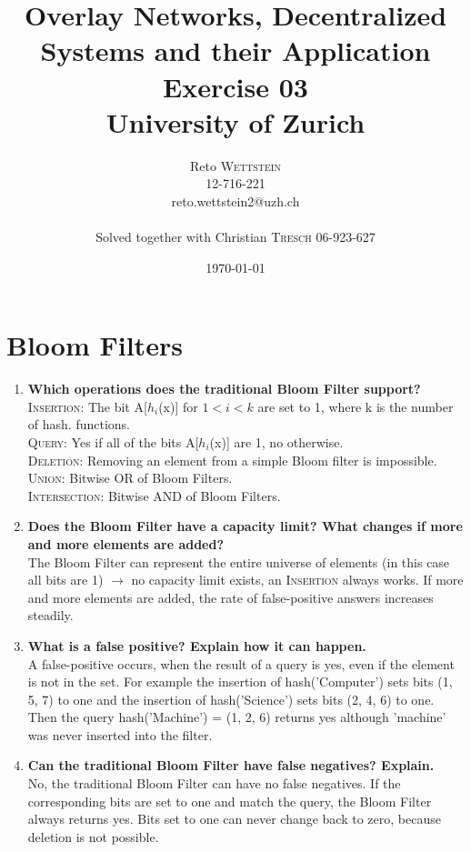 \documentclass{article}
\title{\vspace{-50pt}\textbf{Overlay Networks, Decentralized Systems and their Application}\\ Exercise 03 \\ University of Zurich} %
\author{Reto \textsc{Wettstein}\\12-716-221\\reto.wettstein2@uzh.ch \\ \\ Solved together with Christian \textsc{Tresch} 06-923-627} %
\date{\today} %
\begin{document}
\maketitle %


\section{Bloom Filters}
\begin{enumerate}[1]
\item \textbf{Which operations does the traditional Bloom Filter support?} \\
	\textsc{Insertion}: The bit A[$h_{i}$(x)] for $1 < i < k$ are set to 1, where k is the number of hash. functions.\\
	\textsc{Query}: Yes if all of the bits A[$h_{i}$(x)] are 1, no otherwise.\\
	\textsc{Deletion}: Removing an element from a simple Bloom filter is impossible.\\
	\textsc{Union}: Bitwise OR of Bloom Filters.\\
	\textsc{Intersection}: Bitwise AND of Bloom Filters. 

\item \textbf{Does the Bloom Filter have a capacity limit? What changes if more and more elements are added?} \\ The Bloom Filter can represent the entire universe of elements (in this case all bits are 1) $\rightarrow$ no capacity limit  exists, an \textsc{Insertion} always works. If more and more elements are added, the rate of false-positive answers increases steadily. 

\item \textbf{What is a false positive? Explain how it can happen.} \\ A false-positive occurs, when the result of a query is yes, even if the element is not in the set. For example the insertion of hash('Computer') sets bits (1, 5, 7) to one and the insertion of hash('Science') sets bits (2, 4, 6) to one. Then the query hash('Machine') = (1, 2, 6) returns yes although 'machine' was never inserted into the filter.

\item \textbf{Can the traditional Bloom Filter have false negatives? Explain.} \\ No, the traditional Bloom Filter can have no false negatives. If the corresponding bits are set to one and match the query, the Bloom Filter always returns yes. Bits set to one can never change back to zero, because deletion is not possible.  


\end{enumerate}
\end{document}
